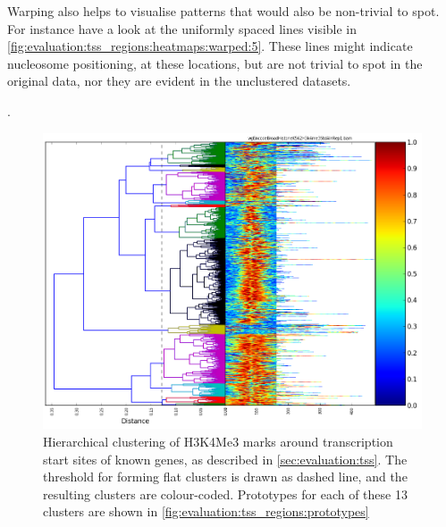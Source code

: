 \documentclass[parskip]{cs4rep}
\begin{document}
Warping also helps to visualise patterns that would also be non-trivial to spot. For instance have a look at the uniformly spaced lines visible in \autoref{fig:evaluation:tss_regions:heatmaps:warped:5}.
These lines might indicate nucleosome positioning, at these locations, but are not trivial to spot in the original data, nor they are evident in the unclustered datasets.

.


\begin{figure}[p]
   \centering
   \includegraphics[height=0.35\textheight]{figures/evaluation/tss_regions/cut.png}
   \caption{Hierarchical clustering of H3K4Me3 marks around transcription start sites of known genes, as described in \autoref{sec:evaluation:tss}. The threshold for forming flat clusters is drawn as dashed line, and the resulting clusters are colour-coded. Prototypes for each of these 13 clusters are shown in \autoref{fig:evaluation:tss_regions:prototypes}}
   \label{fig:evaluation:tss_regions:cut}
\end{figure}
\end{document}
